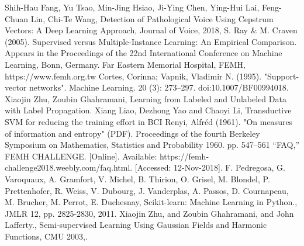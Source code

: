 \documentclass[conference]{IEEEtran}
\begin{document}
\begin{thebibliography}{00}
Shih-Hau Fang, Yu Tsao, Min-Jing Hsiao, Ji-Ying Chen, Ying-Hui Lai, Feng-Chuan Lin, Chi-Te Wang,
Detection of Pathological Voice Using Cepstrum Vectors: A Deep Learning Approach,
Journal of Voice, 2018,
S. Ray \& M. Craven (2005).
Supervised versus Multiple-Instance Learning: An Empirical Comparison.
Appears in the Proceedings of the 22nd International Conference on Machine Learning, Bonn, Germany.
Far Eastern Memorial Hospital, FEMH, https://www.femh.org.tw
Cortes, Corinna; Vapnik, Vladimir N. (1995). "Support-vector networks". Machine Learning. 20 (3): 273–297. doi:10.1007/BF00994018.
Xiaojin Zhu, Zoubin Ghahramani, Learning from Labeled and Unlabeled Data with Label Propagation. 
Xiang Liao, Dezhong Yao and Chaoyi Li, Transductive SVM for reducing the training effort in BCI
Renyi, Alfréd (1961). "On measures of information and entropy" (PDF). Proceedings of the fourth Berkeley Symposium on Mathematics, Statistics and Probability 1960. pp. 547–561
“FAQ,” FEMH CHALLENGE. [Online]. Available: https://femh-challenge2018.weebly.com/faq.html. [Accessed: 12-Nov-2018].
F. Pedregosa, G. Varoquaux, A. Gramfort, V. Michel, B. Thirion, O. Grisel, M. Blondel, P. Prettenhofer, R. Weiss, V. Dubourg, J. Vanderplas, A. Passos, D. Cournapeau, M. Brucher, M. Perrot, E. Duchesnay, Scikit-learn: Machine Learning in Python., JMLR 12, pp. 2825-2830, 2011.
Xiaojin Zhu, and Zoubin Ghahramani, and John Lafferty., Semi-supervised Learning Using Gaussian Fields and Harmonic Functions, CMU 2003,.

\end{thebibliography}
\end{document}
